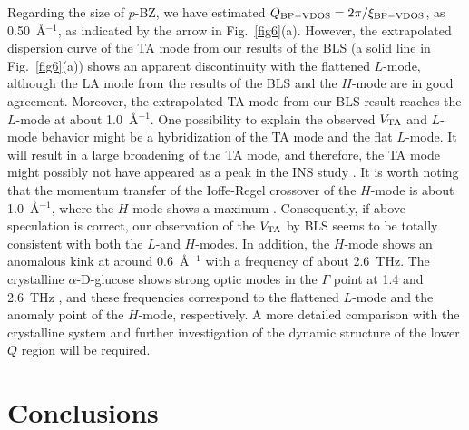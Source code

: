 \documentclass[%
 reprint,
superscriptaddress,
 amsmath,amssymb,
 aps,
prb,
]{revtex4-1}
\begin{document}
Regarding the size of $p$-BZ, we have estimated $Q_{\rm BP-VDOS} = 2\pi/\xi_{\rm BP-VDOS}$, as 0.50~\AA$^{-1}$, as indicated by the arrow in Fig.~\ref{fig6}(a).
However, the extrapolated dispersion curve of the TA mode from our results of the BLS (a solid line in Fig.~\ref{fig6}(a)) shows an apparent discontinuity with the flattened $L$-mode, although the LA mode from the results of the BLS and the $H$-mode are in good agreement.
Moreover, the extrapolated TA mode from our BLS result reaches the $L$-mode at about 1.0~\AA$^{-1}$.
One possibility to explain the observed $V_{\rm TA}$ and $L$-mode behavior might be a hybridization of the TA mode and the flat $L$-mode.
It will result in a large broadening of the TA mode, and therefore, the TA mode might possibly not have appeared as a peak in the INS study \cite{Violini2012}.
It is worth noting that the momentum transfer of the Ioffe-Regel crossover of the $H$-mode is about 1.0~\AA$^{-1}$, where the $H$-mode shows a maximum \cite{Violini2012}.
Consequently, if above speculation is correct, our observation of the $V_{\rm TA}$ by BLS seems to be totally consistent with both the $L$-and $H$-modes.
In addition, the $H$-mode shows an anomalous kink at around 0.6~\AA$^{-1}$ with a frequency of about 2.6~THz.
The crystalline $\alpha$-D-glucose shows strong optic modes in the $\Gamma$ point at 1.4 and 2.6~THz \cite{Walther2003}, and these frequencies correspond to the flattened $L$-mode and the anomaly point of the $H$-mode, respectively.
A more detailed comparison with the crystalline system and further investigation of the dynamic structure of the lower $Q$ region will be required.


\section{\label{sec:level1}Conclusions}
\end{document}
